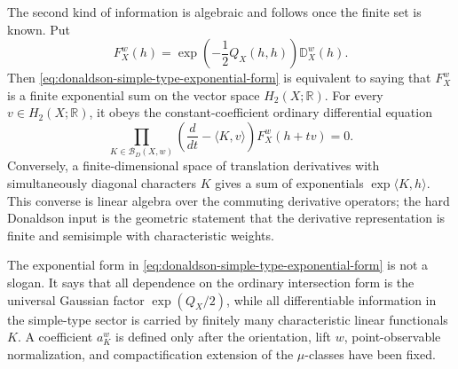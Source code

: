 The second kind of information is algebraic and follows once the finite set is
known.  Put
\begin{equation}
  F_X^w(h)
  =
  \exp\!\left(-\frac{1}{2}Q_X(h,h)\right)\mathbb D_X^w(h).
  \label{eq:donaldson-reduced-finite-transform}
\end{equation}
Then \eqref{eq:donaldson-simple-type-exponential-form} is equivalent to saying
that \(F_X^w\) is a finite exponential sum on the vector space
\(H_2(X;\mathbb R)\).  For every \(v\in H_2(X;\mathbb R)\), it obeys the
constant-coefficient ordinary differential equation
\begin{equation}
  \prod_{K\in\mathcal B_D(X,w)}
  \left(
    \frac{d}{dt}-\langle K,v\rangle
  \right)
  F_X^w(h+tv)
  =
  0 .
  \label{eq:donaldson-finite-exponential-ode}
\end{equation}
Conversely, a finite-dimensional space of translation derivatives with
simultaneously diagonal characters \(K\) gives a sum of exponentials
\(\exp\langle K,h\rangle\).  This converse is linear algebra over the
commuting derivative operators; the hard Donaldson input is the geometric
statement that the derivative representation is finite and semisimple with
characteristic weights.

The exponential form in
\eqref{eq:donaldson-simple-type-exponential-form} is not a slogan.  It says
that all dependence on the ordinary intersection form is the universal
Gaussian factor \(\exp(Q_X/2)\), while all differentiable information in the
simple-type sector is carried by finitely many characteristic linear
functionals \(K\).  A coefficient \(a_K^w\) is defined only after the
orientation, lift \(w\), point-observable normalization, and compactification
extension of the \(\mu\)-classes have been fixed.

